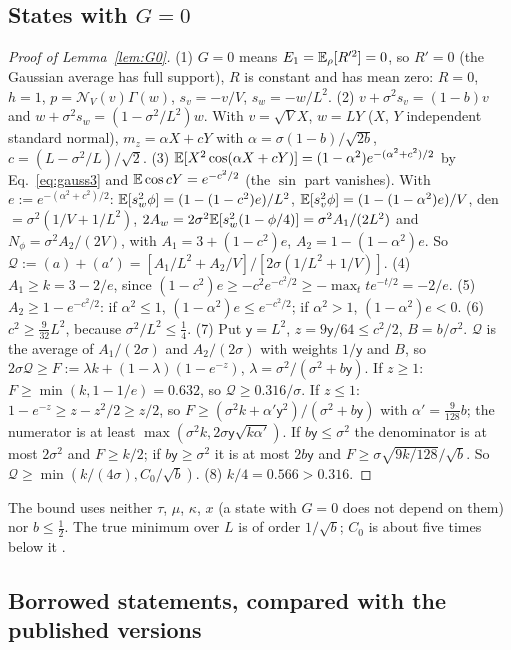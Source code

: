 \subsection{States with $G=0$}
\label{app:A:G0}

\begin{proof}[Proof of Lemma~\ref{lem:G0}]
(1) $G=0$ means $E_1=\mathbb{E}_\rho[R'^2]=0$, so $R'=0$ (the Gaussian average has full support), $R$ is constant and has mean zero: $R=0$, $h=1$, $p=\mathcal N_V(v)\Gamma(w)$, $s_v=-v/V$, $s_w=-w/L^2$.
(2) $v+\sigma^2s_v=(1-b)v$ and $w+\sigma^2s_w=(1-\sigma^2/L^2)w$. With $v=\sqrt VX$, $w=LY$ ($X$, $Y$ independent standard normal), $m_z=\alpha X+cY$ with $\alpha=\sigma(1-b)/\sqrt{2b}$, $c=(L-\sigma^2/L)/\sqrt2$.
(3) $\mathbb{E}[X^2\cos(\alpha X+cY)]=(1-\alpha^2)e^{-(\alpha^2+c^2)/2}$ by Eq.~\eqref{eq:gauss3} and $\mathbb{E}\cos cY=e^{-c^2/2}$ (the $\sin$ part vanishes). With $e:=e^{-(\alpha^2+c^2)/2}$: $\mathbb{E}[s_w^2\phi]=(1-(1-c^2)e)/L^2$, $\mathbb{E}[s_v^2\phi]=(1-(1-\alpha^2)e)/V$, den $=\sigma^2(1/V+1/L^2)$, $2A_w=2\sigma^2\mathbb{E}[s_w^2(1-\phi/4)]=\sigma^2A_1/(2L^2)$ and $N_\phi=\sigma^2A_2/(2V)$, with $A_1=3+(1-c^2)e$, $A_2=1-(1-\alpha^2)e$. So
$\mathcal Q:=(a)+(a')=[A_1/L^2+A_2/V]/[2\sigma(1/L^2+1/V)]$.
(4) $A_1\ge k=3-2/e$, since $(1-c^2)e\ge-c^2e^{-c^2/2}\ge-\max_tte^{-t/2}=-2/e$.
(5) $A_2\ge1-e^{-c^2/2}$: if $\alpha^2\le1$, $(1-\alpha^2)e\le e^{-c^2/2}$; if $\alpha^2>1$, $(1-\alpha^2)e<0$.
(6) $c^2\ge\frac9{32}L^2$, because $\sigma^2/L^2\le\frac14$.
(7) Put $\mathsf y=L^2$, $z=9\mathsf y/64\le c^2/2$, $B=b/\sigma^2$. $\mathcal Q$ is the average of $A_1/(2\sigma)$ and $A_2/(2\sigma)$ with weights $1/\mathsf y$ and $B$, so $2\sigma\mathcal Q\ge F:=\lambda k+(1-\lambda)(1-e^{-z})$, $\lambda=\sigma^2/(\sigma^2+b\mathsf y)$.
If $z\ge1$: $F\ge\min(k,1-1/e)=0.632$, so $\mathcal Q\ge0.316/\sigma$.
If $z\le1$: $1-e^{-z}\ge z-z^2/2\ge z/2$, so $F\ge(\sigma^2k+\alpha'\mathsf y^2)/(\sigma^2+b\mathsf y)$ with $\alpha'=\frac9{128}b$; the numerator is at least $\max(\sigma^2k,2\sigma\mathsf y\sqrt{k\alpha'})$. If $b\mathsf y\le\sigma^2$ the denominator is at most $2\sigma^2$ and $F\ge k/2$; if $b\mathsf y\ge\sigma^2$ it is at most $2b\mathsf y$ and $F\ge\sigma\sqrt{9k/128}/\sqrt b$. So $\mathcal Q\ge\min(k/(4\sigma),C_0/\sqrt b)$.
(8) $k/4=0.566>0.316$.
\end{proof}
The bound uses neither $\tau$, $\mu$, $\kappa$, $x$ (a state with $G=0$ does not depend on them) nor $b\le\frac12$. The true minimum over $L$ is of order $1/\sqrt b$; $C_0$ is about five times below it \numst.

\subsection{Borrowed statements, compared with the published versions}
\label{app:A:borrowed}

